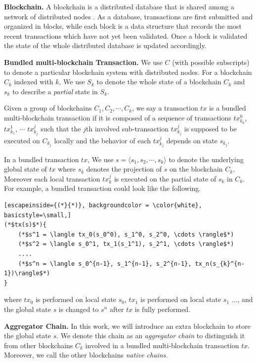 \documentclass[pageno]{jpaper}
\begin{document}
\smallskip\noindent\textbf{Blockchain.}
A blockchain is a distributed database that is shared among a network of distributed nodes \cite{chen2018survey}. As a database, transactions are first submitted and organized in blocks, while each block is a data structure that records the most recent transactions which have not yet been validated. Once a block is validated the state of the whole distributed database is updated accordingly.

\smallskip\noindent\textbf{Bundled multi-blockchain Transaction.}
We use $C$ (with possible subscripts) to denote a particular blockchain system with distributed nodes. For a blockchain $C_k$ indexed with $k$, We use $S_k$ to denote the whole state of a blockchain $C_{k}$ and $s_k$ to describe a \emph{partial} state in $S_k$.

Given a group of blockchains $C_{1}, C_{2}, \cdots, C_{k}$, we say a transaction $tx$ is a bundled multi-blockchain transaction if it is composed of a sequence of transactions $tx_{k_0}^0$, $tx_{k_1}^1$, $\cdots$ $tx_{k_j}^j$ such that the $j$th involved sub-transaction $tx_{k_j}^j$ is supposed to be executed on $C_{k_j}$ locally and the behavior of each $tx_{k_j}^{j}$ depends on state $s_{k_j}$. 

In a bundled transaction $tx$, We use $s= \langle s_1, s_2, \cdots, s_k \rangle$ to denote the underlying global state of $tx$ where $s_k$ denotes the projection of $s$ on the blockchain $C_k$. Moreover each local transaction $tx_k^j$ is executed on the partial state of $s_k$ in $C_k$. For example, a bundled transaction could look like the following. 
\begin{lstlisting}[escapeinside={(*}{*)}, backgroundcolor = \color{white}, basicstyle=\small,]
(*$tx(s)$*){
    (*$s^1 = \langle tx_0(s_0^0), s_1^0, s_2^0, \cdots \rangle$*)
    (*$s^2 = \langle s_0^1, tx_1(s_1^1), s_2^1, \cdots \rangle$*)
    ....
    (*$s^n = \langle s_0^{n-1}, s_1^{n-1}, s_2^{n-1}, tx_n(s_{k}^{n-1})\rangle$*)
}
\end{lstlisting}
where $tx_0$ is performed on local state $s_0$, $tx_1$ is performed on local state $s_1$ ..., and the global state $s$ is changed to $s^n$ after $tx$ is fully performed.

\smallskip\noindent\textbf{Aggregator Chain.}
In this work, we will introduce an extra blockchain to store the global state $s$. We denote this chain as an \emph{aggregator chain} to distinguish it from other blockchains $C_{k}$ involved in a bundled multi-blockchain transaction $tx$. Moreover, we call the other blockchains \emph{native chains}.
\end{document}
